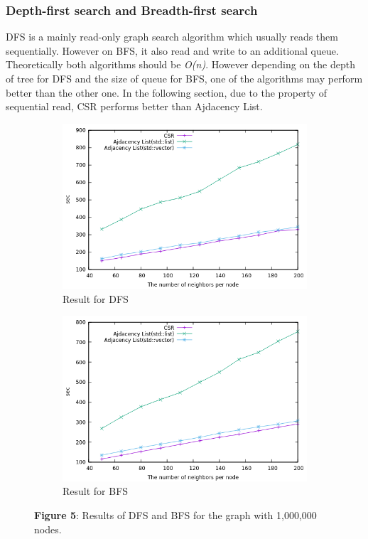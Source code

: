 \documentclass{article}
\begin{document}
\subsubsection*{Depth-first search and Breadth-first search}
DFS is a mainly read-only graph search algorithm which usually reads them sequentially. However on BFS, it also read and write to an additional queue. Theoretically both algorithms should be \textit{O(n)}. However depending on the depth of tree for DFS and the size of queue for BFS, one of the algorithms may perform better than the other one. In the following section, due to the property of sequential read, CSR performs better than Ajdacency List.
\begin{figure}[h]
\begin{subfigure}[h]{0.49\textwidth}
\includegraphics[scale = 0.425]{DFS}
\caption{Result for DFS}\label{fig:figA}
\end{subfigure}
\begin{subfigure}[h]{0.49\textwidth}
\includegraphics[scale = 0.425]{BFS}
\caption{Result for BFS}\label{fig:figB}
\end{subfigure}
\caption*{\textbf{Figure 5}: Results of DFS and BFS for the graph with 1,000,000 nodes.}
\end{figure} 
\end{document}
